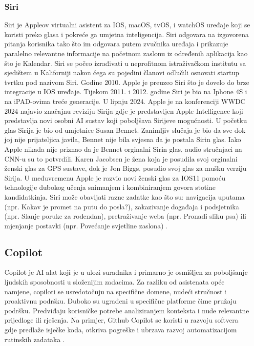 \documentclass[]{foi}
\begin{document}
\subsubsection{Siri}

Siri je Appleov virtualni asistent za IOS, macOS, tvOS, i watchOS uređaje koji se koristi preko glasa i pokreće ga umjetna inteligencija. Siri odgovara na izgovorena pitanja korisnika
tako što im odgovara putem zvučnika uređaja i prikazuje paralelno relevantne informacije na početnom zaslonu iz određenih aplikacija kao što je Kalendar. Siri se počeo izrađivati
u neprofitnom istraživačkom institutu sa sjedištem u Kaliforniji nakon čega su pojedini članovi odlučili osnovati startup tvrtku pod nazivom Siri. Godine 2010. Apple je preuzeo Siri što
je dovelo do brze integracije u IOS uređaje. Tijekom 2011. i 2012. godine Siri je bio na Iphone 4S i na iPAD-ovima treće generacije. U lipnju 2024. Apple je na konferenciji WWDC 2024 najavio značajnu
reviziju Sirija gdje je predstavljen Apple Intelligence koji predstavlja novi osobni AI sustav koji poboljšava Sirijeve mogućnosti. U početku glas Sirija je bio od umjetnice Susan Bennet. Zanimljiv slučaja
je bio da sve dok joj nije prijateljica javila, Bennet nije bila svjesna da je postala Sirin glas. Iako Apple nikada nije priznao da je Bennet orginalni Sirin glas, audio stručnjaci na CNN-u
su to potvrdili. Karen Jacobsen je žena koja je posudila svoj orginalni ženski glas za GPS sustave, dok je Jon Biggs, posudio svoj glas za mušku verziju Sirija. U međuvremenu Apple je razvio novi ženski glas za IOS11
pomoću tehnologije dubokog učenja snimanjem i kombiniranjem govora stotine kandidatkinja. Siri može obavljati razne zadatke kao što su: navigacija uputama (npr. Kakav je promet na putu do posla?),
zakazivanje događaja i podsjetnika (npr. Slanje poruke za rođendan), pretraživanje weba (npr. Pronađi sliku psa) ili mjenjanje postavki (npr. Povećanje svjetline zaslona) \cite{mixon_siri_2025}.

\subsection{Copilot}

Copilot je AI alat koji je u ulozi suradnika i primarno je osmišljen za poboljšanje ljudskih sposobnosti u složenijim zadacima. Za razliku od asistenata opće namjene, copiloti se usredotočuju na specifične domene,
nudeći stručnost i proaktivnu podršku. Duboko su ugrađeni u specifične platforme čime pružaju podršku. Predviđaju korisničke potrebe analiziranjem konteksta i nude relevantne prijedloge ili rješenja.
Na primjer, Github Copilot se koristi u razvoju softvera gdje predlaže isječke koda, otkriva pogreške i ubrzava razvoj automatizacijom rutinskih zadataka \cite{exomindset2025difference}.
\end{document}
